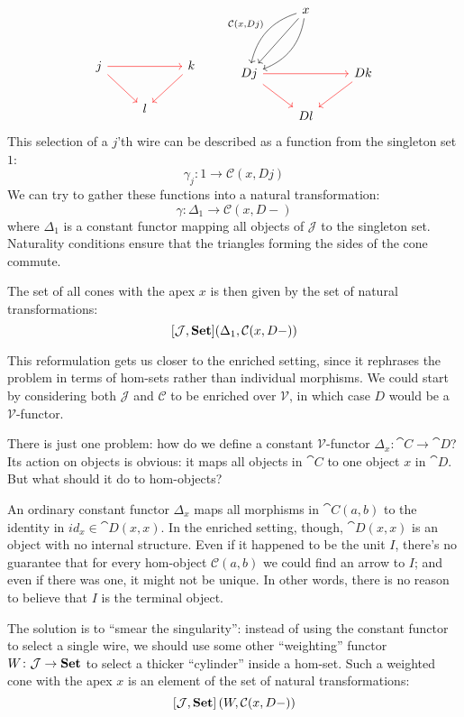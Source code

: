 \documentclass[DaoFP]{subfiles}
\begin{document}
\[
 \begin{tikzcd}
 \\
 \\
j
\arrow[rr, red]
\arrow[rd, red]
&& k
\arrow[dl, red]
\\
& l
 \end{tikzcd}
 \qquad
 \begin{tikzcd}
  & x
 \arrow[ddl, ""']
 \arrow[ddl, bend right, "{\mathcal C(x, D j)}"']
 \arrow[ddl, bend left, ""]
 \\
\\
D j
\arrow[rr, red]
\arrow[rd, red]
&& D k
\arrow[dl, red]
\\
& D l
 \end{tikzcd}
 \]
This selection of a $j$'th wire can be described as a function from the singleton set $1$:
\[ \gamma_j \colon 1 \to \mathcal C(x, D j) \]
We can try to gather these functions into a natural transformation:
\[ \gamma \colon \Delta_1 \to \mathcal C(x, D -) \]
where $\Delta_1$ is a constant functor mapping all objects of $\mathcal J$ to the singleton set. Naturality conditions ensure that the triangles forming the sides of the cone commute. 

The set of all cones  with the apex $x$ is then given by the set of natural transformations:
\[ [\mathcal J, \mathbf{Set}] (\Delta_1, \mathcal C(x, D-)) \]

This reformulation gets us closer to the enriched setting, since it rephrases the problem in terms of hom-sets rather than individual morphisms. We could start by considering both $\mathcal J$ and $\mathcal C$ to be enriched over $\mathcal V$, in which case $D$ would be a $\mathcal V$-functor. 

There is just one problem: how do we define a constant $\mathcal V$-functor $\Delta_x \colon \cat C \to \cat D$? Its action on objects is obvious:  it maps all objects in $\cat C$ to one object $x$ in $\cat D$. But what should it do to hom-objects? 

An ordinary constant functor $\Delta_x$ maps all morphisms in $\cat C(a, b)$ to the identity in $id_x \in \cat D(x, x)$. In the enriched setting, though, $\cat D(x, x)$ is an object with no internal structure. Even if it happened to be the unit $I$, there's no guarantee that for every hom-object $\mathcal C(a, b)$ we could find an arrow to $I$; and even if there was one, it might not be unique. In other words, there is no reason to believe that $I$ is the terminal object.

The solution is to ``smear the singularity'': instead of using the constant functor to select a single wire, we should use some other ``weighting'' functor $W \colon \mathcal J\to \mathbf{Set}$ to select a thicker ``cylinder'' inside a hom-set. Such a weighted cone with the apex $x$ is an element of the set of natural transformations:
\[ [\mathcal J, \mathbf{Set}] \left(W, \mathcal C(x, D-)\right) \]
\end{document}
